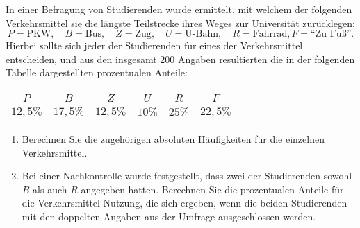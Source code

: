 \documentclass{exercise}
\begin{document}
    \begin{problem}
        In einer Befragung von Studierenden wurde ermittelt, mit welchem der folgenden Verkehrsmittel sie die längste Teilstrecke ihres Weges zur Universität zurücklegen:
        \[
            P = \text{PKW}, \quad B = \text{Bus}, \quad Z = \text{Zug}, \quad U = \text{U-Bahn}, \quad R = \text{Fahrrad}, F = \text{``Zu Fuß''}.
        \]
        Hierbei sollte sich jeder der Studierenden fur eines der Verkehrsmittel entscheiden, und aus den insgesamt 200 Angaben resultierten die in der folgenden Tabelle dargestellten prozentualen Anteile:
        \begin{center}
            \begin{tabular}{cccccc}
                \toprule
                \(P\) & \(B\) & \(Z\) & \(U\) & \(R\) & \(F\)\\
                \midrule
                \(12,5\%\) & \(17,5\%\) & \(12,5\%\) & \(10\%\) & \(25\%\) & \(22,5\%\)\\
                \bottomrule
            \end{tabular}
        \end{center}
        \begin{enumerate}
            \item Berechnen Sie die zugehörigen absoluten Häufigkeiten für die einzelnen Verkehrsmittel.
            \item Bei einer Nachkontrolle wurde festgestellt, dass zwei der Studierenden sowohl \(B\) als auch \(R\) angegeben hatten.
            Berechnen Sie die prozentualen Anteile für die Verkehrsmittel-Nutzung, die sich ergeben, wenn die beiden Studierenden mit den doppelten Angaben aus der Umfrage ausgeschlossen werden.
        \end{enumerate}
    \end{problem}
\end{document}
